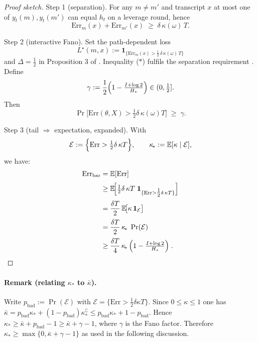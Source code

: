 \documentclass[11pt]{article}
\newcommand{\Err}{\mathrm{Err}}
\newcommand{\E}{\mathbb{E}}
\begin{document}
\begin{proof}[Proof sketch]
Step 1 (separation).
For any $m\neq m'$ and transcript $x$ at most one of
$y_t(m),y_t(m')$ can equal $h_t$ on a leverage round, hence
\[
  \Err_m(x)+\Err_{m'}(x)\;\ge\;\delta\,\kappa(\omega)\,T.
  \tag{$\ast$}
\]

\noindent
Step 2 (interactive Fano). 
Set the path-dependent loss
\[
  L^\star(m,x)
    := \mathbf{1}_{\{\Err_m(x)>\tfrac12\,\delta\,\kappa(\omega)\,T\}}
\]
and $\Delta=\tfrac12$ in Proposition 3 of
\citep{chen2024interfano}.
Inequality ($\ast$) fulfils the separation requirement
\citep[Eq.\,(5)]{chen2024interfano}.
Define
\[
  \gamma:=\frac12\Bigl(1-\tfrac{I+\log 2}{H_{\star}}\Bigr)\in(0,\tfrac12].
\]
Then
\begin{equation}\tag{$\dagger$}
  \Pr\!\bigl[\Err(\theta,X)>\tfrac12\delta\,\kappa(\omega)T\bigr]
  \;\ge\;\gamma .
\end{equation}

\medskip\noindent
Step 3 (tail $\Rightarrow$ expectation, expanded).
With
\[
  \mathcal E:=\Bigl\{\Err>\tfrac12\delta\,\kappa T\Bigr\},
  \qquad
  \kappa_{\!*}:=\E[\kappa\mid\mathcal E],
\]
we have:
\[
\begin{aligned}
  \Err_{\mathrm{bar}}
    &=\E[\Err] \\[2pt]
    &\ge
      \E\!\Bigl[
        \tfrac12\delta\,\kappa T\;
        \mathbf{1}_{\{\Err>\tfrac12\delta\,\kappa T\}}
      \Bigr] \\[2pt]
    &=\frac{\delta T}{2}\,
      \E\!\bigl[\kappa\,\mathbf{1}_{\mathcal E}\bigr] \\[2pt]
    &=\frac{\delta T}{2}\,
      \kappa_{\!*}\;
      \Pr(\mathcal E) \\[2pt]
    &\ge \frac{\delta T}{4}\,\kappa_{\!*}\, \Bigl(1-\tfrac{I+\log 2}{H_{\star}}\Bigr)\;.
\end{aligned}
\]

\end{proof}

\paragraph{Remark (relating $\kappa_{\!*}$ to $\bar\kappa$).}
Write $p_{\mathrm{bad}}:=\Pr(\mathcal E)$ with 
$\mathcal E=\{\Err>\tfrac12\delta\kappa T\}$.  
Since $0\!\le\!\kappa\!\le\!1$ one has
$\bar\kappa
   =p_{\mathrm{bad}}\kappa_{\!*}
    +(1-p_{\mathrm{bad}})\kappa^{\complement}_{\!*}
   \le p_{\mathrm{bad}}\kappa_{\!*}+1-p_{\mathrm{bad}}$.
Hence  
$\kappa_{\!*}\ge\bar\kappa+p_{\mathrm{bad}}-1
            \ge\bar\kappa+\gamma-1$,
where $\gamma$ is the Fano factor.  Therefore
$\kappa_{\!*}\ge\max\{0,\bar\kappa+\gamma-1\}$ as used in the following
discussion.
\end{document}
